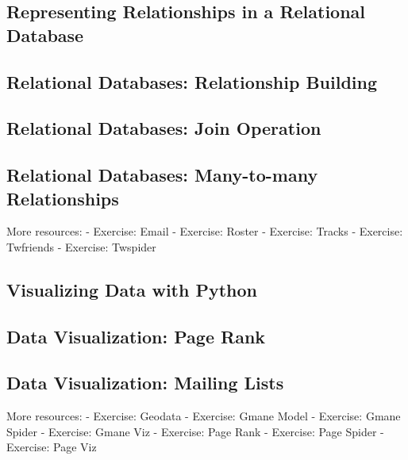 \documentclass{article}%
\begin{document}
\subsection{Representing Relationships in a Relational Database}%
\label{subsec:RepresentingRelationshipsinaRelationalDatabase}%

%
\subsection{Relational Databases: Relationship Building}%
\label{subsec:RelationalDatabasesRelationshipBuilding}%

%
\subsection{Relational Databases: Join Operation}%
\label{subsec:RelationalDatabasesJoinOperation}%

%
\subsection{Relational Databases: Many{-}to{-}many Relationships}%
\label{subsec:RelationalDatabasesMany{-}to{-}manyRelationships}%
More resources:\newline%
{-} Exercise: Email\newline%
{-} Exercise: Roster\newline%
{-} Exercise: Tracks\newline%
{-} Exercise: Twfriends\newline%
{-} Exercise: Twspider\newline%

%
\subsection{Visualizing Data with Python}%
\label{subsec:VisualizingDatawithPython}%

%
\subsection{Data Visualization: Page Rank}%
\label{subsec:DataVisualizationPageRank}%

%
\subsection{Data Visualization: Mailing Lists}%
\label{subsec:DataVisualizationMailingLists}%
More resources:\newline%
{-} Exercise: Geodata\newline%
{-} Exercise: Gmane Model\newline%
{-} Exercise: Gmane Spider\newline%
{-} Exercise: Gmane Viz\newline%
{-} Exercise: Page Rank\newline%
{-} Exercise: Page Spider\newline%
{-} Exercise: Page Viz\newline%
\end{document}
